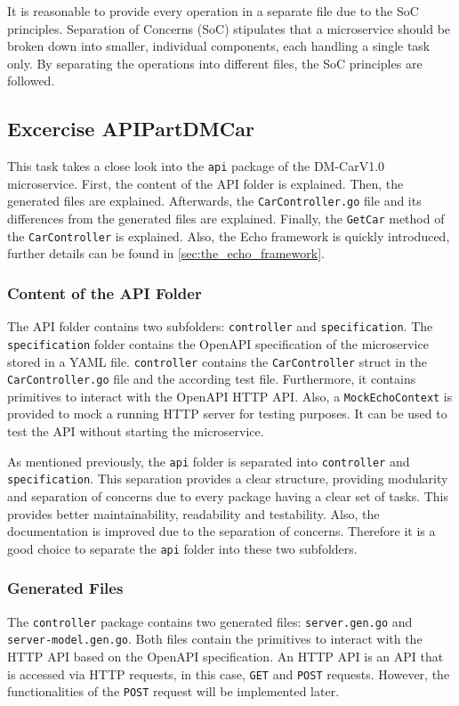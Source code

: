 It is reasonable to provide every operation in a separate file due to the SoC principles.
Separation of Concerns (SoC) stipulates that a microservice should be broken down into smaller, individual components, each handling a single task only.
By separating the operations into different files, the SoC principles are followed.
\subsection{Excercise APIPartDMCar}
This task takes a close look into the \texttt{api} package of the DM-CarV1.0 microservice.
First, the content of the API folder is explained.
Then, the generated files are explained.
Afterwards, the \texttt{CarController.go} file and its differences from the generated files are explained.
Finally, the \texttt{GetCar} method of the \texttt{CarController} is explained.
Also, the Echo framework is quickly introduced, further details can be found in \autoref{sec:the_echo_framework}.
\subsubsection*{Content of the API Folder}
The API folder contains two subfolders: \texttt{controller} and \texttt{specification}. \linebreak
The \texttt{specification} folder contains the OpenAPI specification of the microservice stored in a YAML file.
\texttt{controller} contains the \texttt{CarController} struct in the \texttt{CarController.go} file and the according test file.
Furthermore, it contains primitives to interact with the OpenAPI HTTP API.
Also, a \texttt{MockEchoContext} is provided to mock a running HTTP server for testing purposes.
It can be used to test the API without starting the microservice.

As mentioned previously, the \texttt{api} folder is separated into \texttt{controller} and \texttt{specification}.
This separation provides a clear structure, providing modularity and separation of concerns due to every package having a clear set of tasks.
This provides better maintainability, readability and testability.
Also, the documentation is improved due to the separation of concerns.
Therefore it is a good choice to separate the \texttt{api} folder into these two subfolders.
\subsubsection*{Generated Files}
The \texttt{controller} package contains two generated files: \texttt{server.gen.go} and \hfill \linebreak \texttt{server-model.gen.go}.
Both files contain the primitives to interact with the HTTP API based on the OpenAPI specification.
An HTTP API is an API that is accessed via HTTP requests, in this case, \texttt{GET} and \texttt{POST} requests.
However, the functionalities of the \texttt{POST} request will be implemented later. 

